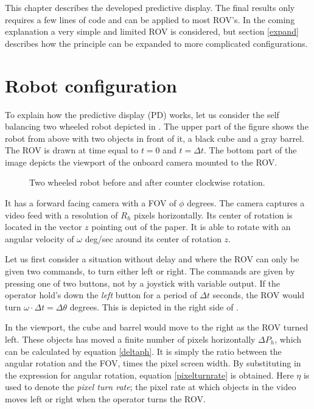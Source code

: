 This chapter describes the developed predictive display. The final results only requires a few lines of code and can be applied to most ROV's. In the coming explanation a very simple and limited ROV is considered, but section \ref{expand} describes how the principle can be expanded to more complicated configurations.

\section{Robot configuration} \label{chp31}
 
To explain how the predictive display (PD) works, let us consider the self balancing two wheeled robot depicted in . The upper part of the figure shows the robot from above with two objects in front of it, a black cube and a gray barrel. The ROV is drawn at time equal to $t=0$ and $t=\Delta t$. The bottom part of the image depicts the viewport of the onboard camera mounted to the ROV.


\begin{figure}[h!]    
    \centering           
    \def\svgwidth{.75\columnwidth}
    
    \caption{Two wheeled robot before and after counter clockwise rotation.}
    \label{twoWheeled}
\end{figure}


It has a forward facing camera with a FOV of $\phi$ degrees. The camera captures a video feed with a resolution of $R_h$ pixels horizontally. Its center of rotation is located in the vector $z$ pointing out of the paper. It is able to rotate with an angular velocity of $\omega$ deg/sec around its center of rotation $z$.

Let us first consider a situation without delay and where the ROV can only be given two commands, to turn either left or right. The commands are given by pressing one of two buttons, not by a joystick with variable output. If the operator hold's down the \emph{left} button for a period of $\Delta t$ seconds, the ROV would turn $\omega \cdot \Delta t = \Delta \theta$ degrees. This is depicted in the right side of .

In the viewport, the cube and barrel would move to the right as the ROV turned left. These objects has moved a finite number of pixels horizontally $\Delta P_h$, which can be calculated by equation \ref{deltaph}. It is simply the ratio between the angular rotation and the FOV, times the pixel screen width. By substituting in the expression for angular rotation, equation \ref{pixelturnrate} is obtained. Here $\eta$ is used to denote the \textit{pixel turn rate}; the pixel rate at which objects in the video moves left or right when the operator turns the ROV.

